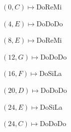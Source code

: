 \documentclass[preview]{standalone}
\begin{document}
\begin{center}
$(0,C) \mapsto$DoReMi

$(4,E) \mapsto$DoDoDo

$(8,E) \mapsto$DoReMi

$(12,G) \mapsto$DoDoDo

$(16,F) \mapsto$DoSiLa

$(20,D) \mapsto$DoDoDo

$(24,E) \mapsto$DoSiLa

$(24,C) \mapsto$DoDoDo
\end{center}
\end{document}
